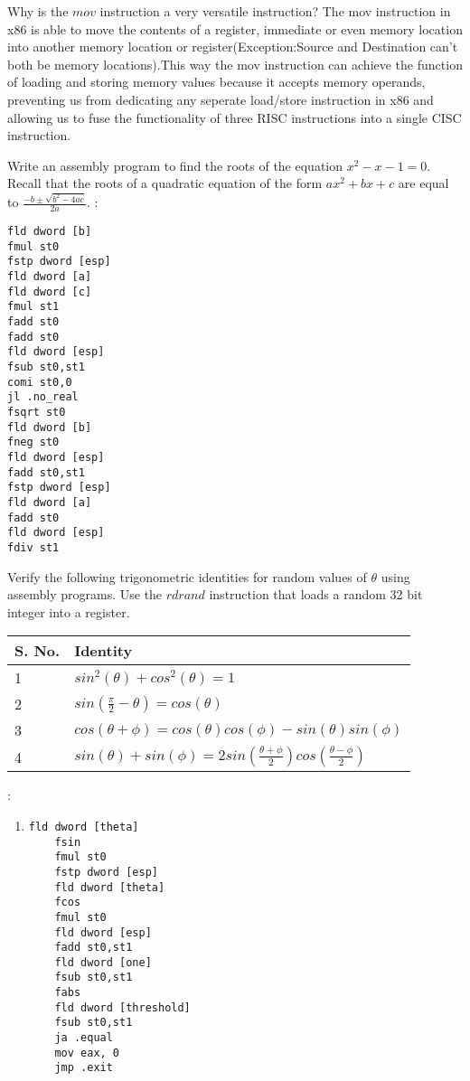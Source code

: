 \begin{ExerciseList}
\Exercise
Why is the $mov$ instruction a very versatile instruction?
\Answer
The mov instruction in x86 is able to move the contents of a register, immediate or even memory location into another memory location or register(Exception:Source and Destination can't both be memory locations).This way the mov instruction can achieve the function of loading and storing memory values because it accepts memory operands, preventing us from dedicating any seperate load/store instruction in x86 and allowing us to fuse the functionality of three RISC instructions into a single CISC instruction.

\Exercise
Write an assembly program to find the roots of the equation $x^2 - x - 1 = 0$. Recall that the roots
of a quadratic equation of the form $ax^2 + bx+ c$ are equal to $\frac{-b \pm \sqrt{b^2 - 4ac}}{2a}$.
\Answer :
\begin{Verbatim}[frame=single]
fld dword [b]
fmul st0
fstp dword [esp]
fld dword [a]
fld dword [c]
fmul st1
fadd st0
fadd st0
fld dword [esp]
fsub st0,st1
comi st0,0
jl .no_real
fsqrt st0
fld dword [b]
fneg st0
fld dword [esp]
fadd st0,st1
fstp dword [esp]
fld dword [a]
fadd st0
fld dword [esp]
fdiv st1
\end{Verbatim}

\Exercise Verify the following trigonometric identities for random values of $\theta$ using assembly
programs. Use the
$rdrand$ instruction that loads a random 32 bit integer into a register.

\vskip 1cm

\begin{center}
\begin{tabular}{||l|l||}
\hline
\hline
S. No. & Identity \\
\hline
1 & $sin^2(\theta) + cos^2(\theta) = 1$ \\
\hline
2 & $sin \left ( \frac{\pi}{2} - \theta \right ) = cos(\theta)$ \\
\hline
3 & $cos(\theta + \phi) = cos(\theta)cos(\phi) - sin(\theta)sin(\phi)$ \\
\hline
4 & $sin(\theta) + sin(\phi) = 2 sin \left ( \frac{\theta + \phi}{2} \right ) cos \left ( \frac{\theta - \phi}{2} \right
)$  \\
\hline
\hline
\end{tabular}
\end{center}
\Answer :
\begin{enumerate}
\item \begin{Verbatim}[frame=single]
	fld dword [theta]
	fsin
	fmul st0
	fstp dword [esp]
	fld dword [theta]
	fcos
	fmul st0
	fld dword [esp] 
	fadd st0,st1
	fld dword [one]
	fsub st0,st1
	fabs
	fld dword [threshold]
	fsub st0,st1
	ja .equal
	mov eax, 0
	jmp .exit


\end{Verbatim}
\end{enumerate}
\end{ExerciseList}
